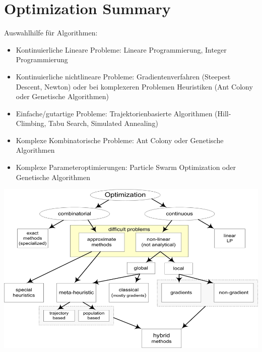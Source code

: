 \section{Optimization Summary}

\begin{minipage}{0.35\textwidth} 
  Auswahlhilfe für Algorithmen:
  \begin{itemize}
    \item Kontinuierliche Lineare Probleme: Lineare Programmierung, Integer Programmierung
    \item Kontinuierliche nichtlineare Probleme: Gradientenverfahren (Steepest Descent, Newton) oder bei komplexeren Problemen Heuristiken (Ant Colony oder Genetische Algorithmen)
    \item Einfache/gutartige Probleme: Trajektorienbasierte Algorithmen (Hill-Climbing, Tabu Search, Simulated Annealing)
    \item Komplexe Kombinatorische Probleme: Ant Colony oder Genetische Algorithmen
    \item Komplexe Parameteroptimierungen: Particle Swarm Optimization oder Genetische Algorithmen
  \end{itemize}
\end{minipage}
\begin{minipage}{0.65\textwidth} 
\includegraphics[width=\textwidth]{./Content/OptimizationSummary/Summary}
\end{minipage}
